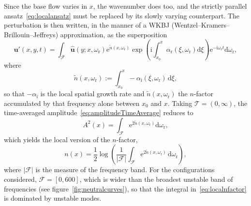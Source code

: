 \documentclass[lineno]{jfm}
\begin{document}
Since the base flow varies in $x$, the wavenumber does too, and the strictly parallel ansatz~\eqref{eq:localansatz} must be replaced by its slowly varying counterpart. The perturbation is then written, in the manner of a WKBJ (Wentzel--Kramers--Brillouin--Jeffreys) approximation, as the superposition
\begin{equation}
	\boldsymbol{u}'(x,y,t)
	=
	\int_{\mathcal{F}}\hat{\boldsymbol{u}}(y;x,\omega_\mathrm{r})
	\mathrm{e}^{\tilde{n}(x,\omega_\mathrm{r})}\exp\left(\mathrm{i}\int_{x_0}^{x}\alpha_\mathrm{r}(\xi,\omega_\mathrm{r})\mathrm{d}\xi\right)
	\mathrm{e}^{-\mathrm{i}\omega_\mathrm{r} t}\mathrm{d}\omega_\mathrm{r},
\end{equation}
where
\begin{equation}
	\tilde{n}(x,\omega_\mathrm{r}) := \int_{x_0}^{x} -\alpha_\mathrm{i}(\xi,\omega_\mathrm{r})\,\mathrm{d}\xi,
\end{equation}
so that $-\alpha_\mathrm{i}$ is the local spatial growth rate and $\tilde{n}(x,\omega_\mathrm{r})$ the $n$-factor accumulated by that frequency alone between $x_0$ and $x$. Taking $\mathcal{T}=(0,\infty)$, the time-averaged amplitude~\eqref{eq:amplitudeTimeAverage} reduces to
\begin{equation}	A^2(x) = \int_{\mathcal{F}} \mathrm{e}^{2 \tilde{n}(x,\omega_\mathrm{r})}\mathrm{d}\omega_\mathrm{r},
\end{equation}
which yields the local version of the $n$-factor,
\begin{equation}\label{eq:localnfactor}
	n(x) = \frac{1}{2}\log\left(\frac{1}{|\mathcal{F}|}\int_{\mathcal{F}} \mathrm{e}^{2 \tilde{n}(x,\omega_\mathrm{r})}\,\mathrm{d}\omega_\mathrm{r}\right),
\end{equation}
where $|\mathcal{F}|$ is the measure of the frequency band. For the configurations considered, $\mathcal{F}=[0,600]$, which is wider than the broadest unstable band of frequencies (see figure~\ref{fig:neutralcurves}), so that the integral in~\eqref{eq:localnfactor} is dominated by unstable modes.
\end{document}
